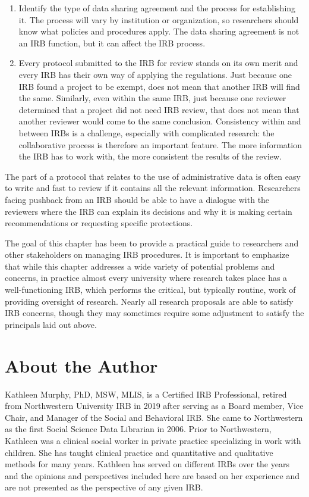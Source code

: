 \begin{enumerate}
\item
  Identify the type of data sharing agreement and the process for establishing it. The process will vary by institution or organization, so researchers should know what policies and procedures apply. The data sharing agreement is not an IRB function, but it can affect the IRB process.
\item
  Every protocol submitted to the IRB for review stands on its own merit and every IRB has their own way of applying the regulations. Just because one IRB found a project to be exempt, does not mean that another IRB will find the same. Similarly, even within the same IRB, just because one reviewer determined that a project did not need IRB review, that does not mean that another reviewer would come to the same conclusion. Consistency within and between IRBs is a challenge, especially with complicated research: the collaborative process is therefore an important feature. The more information the IRB has to work with, the more consistent the results of the review.
\end{enumerate}

The part of a protocol that relates to the use of administrative data is often easy to write and fast to review if it contains all the relevant information. Researchers facing pushback from an IRB should be able to have a dialogue with the reviewers where the IRB can explain its decisions and why it is making certain recommendations or requesting specific protections.

The goal of this chapter has been to provide a practical guide to researchers and other stakeholders on managing IRB procedures. It is important to emphasize that while this chapter addresses a wide variety of potential problems and concerns, in practice almost every university where research takes place has a well-functioning IRB, which performs the critical, but typically routine, work of providing oversight of research. Nearly all research proposals are able to satisfy IRB concerns, though they may sometimes require some adjustment to satisfy the principals laid out above.

\hypertarget{about-the-author-1}{%
\section*{About the Author}\label{about-the-author-1}}

Kathleen Murphy, PhD, MSW, MLIS, is a Certified IRB Professional, retired from Northwestern University IRB in 2019 after serving as a Board member, Vice Chair, and Manager of the Social and Behavioral IRB. She came to Northwestern as the first Social Science Data Librarian in 2006. Prior to Northwestern, Kathleen was a clinical social worker in private practice specializing in work with children. She has taught clinical practice and quantitative and qualitative methods for many years. Kathleen has served on different IRBs over the years and the opinions and perspectives included here are based on her experience and are not presented as the perspective of any given IRB.


